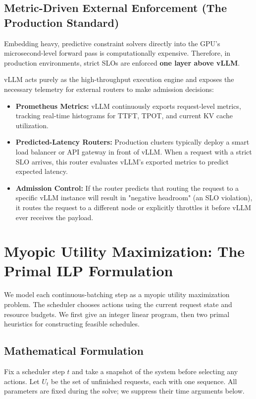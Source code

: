 \documentclass[11pt]{article}
\begin{document}
\subsection{Metric-Driven External Enforcement (The Production Standard)}
\label{subsec:metric_driven_enforcement}

Embedding heavy, predictive constraint solvers directly into the GPU's microsecond-level forward pass is computationally expensive. Therefore, in production environments, strict SLOs are enforced \textbf{one layer above vLLM}.

vLLM acts purely as the high-throughput execution engine and exposes the necessary telemetry for external routers to make admission decisions:
\begin{itemize}
    \item \textbf{Prometheus Metrics:} vLLM continuously exports request-level metrics, tracking real-time histograms for TTFT, TPOT, and current KV cache utilization.
    \item \textbf{Predicted-Latency Routers:} Production clusters typically deploy a smart load balancer or API gateway in front of vLLM. When a request with a strict SLO arrives, this router evaluates vLLM's exported metrics to predict expected latency.
    \item \textbf{Admission Control:} If the router predicts that routing the request to a specific vLLM instance will result in "negative headroom" (an SLO violation), it routes the request to a different node or explicitly throttles it before vLLM ever receives the payload.
\end{itemize}

\section{Myopic Utility Maximization: The Primal ILP Formulation}
\label{sec:general_formulations}

We model each continuous-batching step as a myopic utility maximization problem. The scheduler chooses actions using the current request state and resource budgets. We first give an integer linear program, then two primal heuristics for constructing feasible schedules.

\subsection{Mathematical Formulation}
\label{subsec:myopic_ilp}

Fix a scheduler step \(t\) and take a snapshot of the system before selecting any actions. Let \(U_t\) be the set of unfinished requests, each with one sequence. All parameters are fixed during the solve; we suppress their time arguments below.
\end{document}

